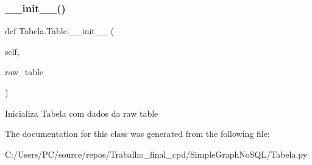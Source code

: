 \subsubsection{\texorpdfstring{\+\_\+\+\_\+init\+\_\+\+\_\+()}{\_\_init\_\_()}}
{\footnotesize\ttfamily def Tabela.\+Table.\+\_\+\+\_\+init\+\_\+\+\_\+ (\begin{DoxyParamCaption}\item[{}]{self,  }\item[{}]{raw\+\_\+table }\end{DoxyParamCaption})}

\begin{DoxyVerb}Inicializa Tabela com dados da raw table\end{DoxyVerb}
 

The documentation for this class was generated from the following file\+:\begin{DoxyCompactItemize}
\item 
C\+:/\+Users/\+P\+C/source/repos/\+Trabalho\+\_\+final\+\_\+cpd/\+Simple\+Graph\+No\+S\+Q\+L/Tabela.\+py\end{DoxyCompactItemize}
